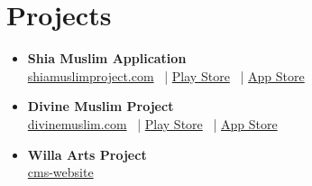 \documentclass[10pt, letterpaper]{article}
\begin{document}
\section{Projects}
\begin{itemize}[leftmargin=*]
    \item \textbf{Shia Muslim Application} \\
    \href{https://shiamuslimproject.com/}{shiamuslimproject.com} \ |
    \href{https://play.google.com/store/apps/details?id=com.shiamuslimproject.main}{Play Store} \ |
    \href{https://apps.apple.com/app/shia-muslim/id1613187510}{App Store}
    \item \textbf{Divine Muslim Project} \\
    \href{https://divinemuslim.com/}{divinemuslim.com} \ |
    \href{https://play.google.com/store/apps/details?id=com.divine.muslim&pcampaignid=web_share}{Play Store} \ |
    \href{https://apps.apple.com/app/divine-muslim/id6453523582}{App Store}
    \item \textbf{Willa Arts Project} \\
    \href{https://www.meshkee.com/cms-website}{cms-website}
\end{itemize}
\end{document}
